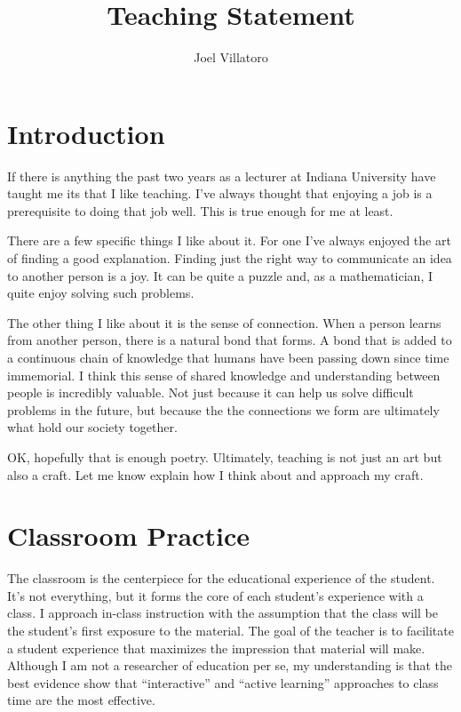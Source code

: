 \documentclass{article}
\title{Teaching Statement}
\author{Joel Villatoro}
\date{}
\begin{document}
\vspace{-0.5in}
\maketitle

\section{Introduction}

If there is anything the past two years as a lecturer at Indiana University have taught me its that I like teaching.
I've always thought that enjoying a job is a prerequisite to doing that job well.
This is true enough for me at least.

There are a few specific things I like about it.
For one I've always enjoyed the art of finding a good explanation. 
Finding just the right way to communicate an idea to another person is a joy. 
It can be quite a puzzle and, as a mathematician, I quite enjoy solving such problems.

The other thing I like about it is the sense of connection. When a person learns from another person, there is a natural bond that forms. 
A bond that is added to a continuous chain of knowledge that humans have been passing down since time immemorial. 
I think this sense of shared knowledge and understanding between people is incredibly valuable.
Not just because it can help us solve difficult problems in the future, but because the the connections we form are ultimately what hold our society together.

OK, hopefully that is enough poetry. Ultimately, teaching is not just an art but also a craft. Let me know explain how I think about and approach my craft.

\section{Classroom Practice}

The classroom is the centerpiece for the educational experience of the student. It's not everything, but it forms the core of each student's experience with a class.
I approach in-class instruction with the assumption that the class will be the student's first exposure to the material. 
The goal of the teacher is to facilitate a student experience that maximizes the impression that material will make.
Although I am not a researcher of education per se, my understanding is that the best evidence show that ``interactive'' and ``active learning'' approaches to class time are the most effective.
\end{document}
